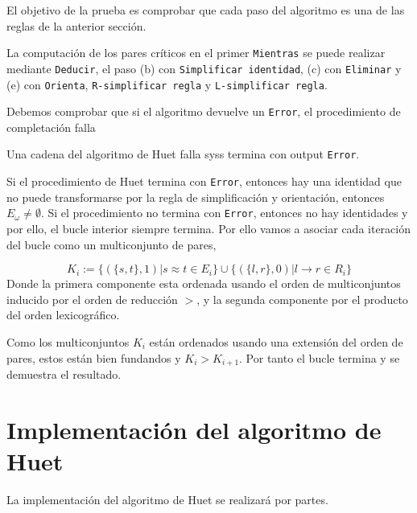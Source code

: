 \begin{demo}
  El objetivo de la prueba es comprobar que cada paso del algoritmo es
  una de las reglas de la anterior sección.
  
  La computación de los pares críticos en el primer \texttt{Mientras}
  se puede realizar mediante \texttt{Deducir}, el paso (b) con
  \texttt{Simplificar identidad}, (c) con \texttt{Eliminar} y (e) con
  \texttt{Orienta}, \texttt{R-simplificar regla} y
  \texttt{L-simplificar regla}.
\end{demo}

Debemos comprobar que si el algoritmo devuelve un \texttt{Error}, el
procedimiento de completación falla

\begin{lema}
Una cadena del algoritmo de Huet falla syss termina con output \texttt{Error}.
\end{lema}

\begin{demo}
  Si el procedimiento de Huet termina con \texttt{Error}, entonces hay
  una identidad que no puede transformarse por la regla de
  simplificación y orientación, entonces $E_\omega \not = \emptyset$.
  Si el procedimiento no termina con \texttt{Error}, entonces no hay
  identidades y por ello, el bucle interior siempre termina. Por ello
  vamos a asociar cada iteración del bucle como un multiconjunto de
  pares,

  \[
    K_i := \{ ( \{s,t \},1) | s \approx t \in E_i \} \cup \{ ( \{l,r
    \},0) | l \rightarrow r \in R_i \}
  \]
  Donde la primera componente esta ordenada usando el orden de
  multiconjuntos inducido por el orden de reducción $>$, y la segunda
  componente por el producto del orden lexicográfico.

  Como los multiconjuntos $K_i$ están ordenados usando una extensión
  del orden de pares, estos están bien fundandos y $K_i >
  K_{i+1}$. Por tanto el bucle termina y se demuestra el resultado.
\end{demo}

\section{Implementación del algoritmo de Huet}

La implementación del algoritmo de Huet se realizará por partes.

